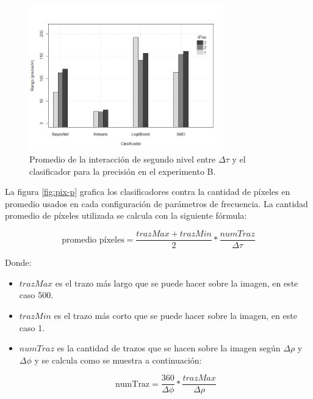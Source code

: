 \begin{figure}[H]

    \centering
	\includegraphics[width=0.75\textwidth]{images/p/p-2I.png}
\caption{Promedio de la interacción de segundo nivel entre $\Delta \tau$ y el clasificador para la precisión en el experimento B.}
\label{tab:2I-B}
\end{figure}

La figura \ref{fig:pix-p} grafica los clasificadores contra la cantidad de píxeles en promedio usados en cada configuración de parámetros de frecuencia.
La cantidad promedio de píxeles utilizada se calcula con la siguiente fórmula:

\begin{equation}
    \text{promedio píxeles} = \frac{trazMax + trazMin}{2} * \frac{numTraz}{\Delta \tau}
\end{equation}

Donde:
\begin{itemize}
    \item $trazMax$ es el trazo más largo que se puede hacer sobre la imagen, en este caso 500.
    \item $trazMin$ es el trazo más corto que se puede hacer sobre la imagen, en este caso 1.
    \item $numTraz$ es la cantidad de trazos que se hacen sobre la imagen según $\Delta \rho$ y $\Delta \phi$ y se calcula como se muestra a continuación:

    \begin{equation}
        \text{numTraz} = \frac{360}{\Delta \phi} * \frac{trazMax}{\Delta \rho}
    \end{equation}
\end{itemize}


